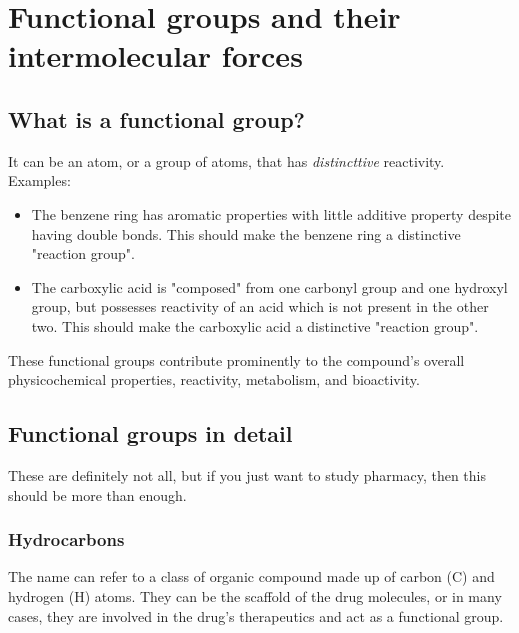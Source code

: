 \documentclass{report}
\begin{document}
			
			
\newpage

\section{Functional groups and their intermolecular forces}
	\subsection{What is a functional group?}
		It can be an atom, or a group of atoms, that has \textit{distincttive} reactivity. \\
		
		Examples:
		\begin{itemize}
			\item{The benzene ring has aromatic properties with little additive property despite having double bonds. This should make the benzene ring a distinctive "reaction group".} 
			\begin{center}
			\end{center}
			\item{The carboxylic acid is "composed" from one carbonyl group and one hydroxyl group, but possesses reactivity of an acid which is not present in the other two. This should make the carboxylic acid a distinctive "reaction group".}
			\begin{center}
			\end{center}
		\end{itemize}
		
		These functional groups contribute prominently to the compound's overall physicochemical properties, reactivity, metabolism, and bioactivity.

	\subsection{Functional groups in detail}
		These are definitely not all, but if you just want to study pharmacy, then this should be more than enough.
		
		\subsubsection{Hydrocarbons}
		The name can refer to a class of organic compound made up of carbon (C) and hydrogen (H) atoms. They can be the scaffold of the drug molecules, or in many cases, they are involved in the drug's therapeutics and act as a functional group. \\
		
\end{document}
